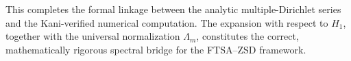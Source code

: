 This completes the formal linkage between the analytic multiple-Dirichlet series and the Kani-verified numerical computation. The expansion with respect to \(H_1\), together with the universal normalization \(\Lambda_m\), constitutes the correct, mathematically rigorous spectral bridge for the FTSA–ZSD framework.
